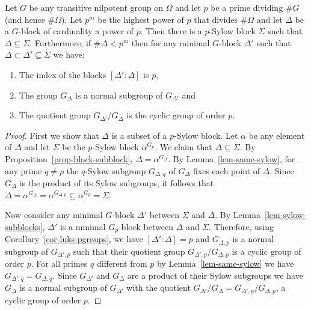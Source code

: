 \documentclass[prodmod,acmtalg]{acmsmall}
\begin{document}
\begin{theorem}\label{thm-if-g-nilpotent}
  Let $G$ be any transitive nilpotent group on $\Omega$ and let $p$ be
  a prime dividing $\# G$ (and hence $\# \Omega$). Let $p^m$ be the
  highest power of $p$ that divides $\# \Omega$ and let $\Delta$ be a
  $G$-block of cardinality a power of $p$. Then there is a $p$-Sylow
  block $\Sigma$ such that $\Delta \subseteq \Sigma$. Furthermore, if
  $\# \Delta < p^m$ then for any minimal $G$-block $\Delta'$ such that
  $\Delta \subset \Delta' \subseteq \Sigma$ we have:
  \begin{enumerate}
  \item The index of the blocks $[\Delta':\Delta]$ is $p$,
  \item The group $G_{\Delta}$ is a normal subgroup of $G_{\Delta'}$ and
  \item The quotient group $G_{\Delta'}/G_\Delta$ is the cyclic group
  of order $p$.
  \end{enumerate}
\end{theorem}
\begin{proof}
  First we show that $\Delta$ is a subset of a $p$-Sylow block.  Let
  $\alpha$ be any element of $\Delta$ and let $\Sigma$ be the
  $p$-Sylow block $\alpha^{G_p}$. We claim that $\Delta\subseteq
  \Sigma$. By Proposition~\ref{prop-block-subblock},
  $\Delta=\alpha^{G_\Delta}$. By Lemma~\ref{lem-same-sylow}, for any
  prime $q\neq p$ the $q$-Sylow subgroup $G_{\Delta,q}$ of $G_\Delta$
  fixes each point of $\Delta$. Since $G_\Delta$ is the product of its
  Sylow subgroups, it follows that
  $\Delta=\alpha^{G_\Delta}=\alpha^{G_{\Delta,p}}\subseteq
  \alpha^{G_p}=\Sigma$.

  Now consider any minimal $G$-block $\Delta'$ between $\Sigma$ and
  $\Delta$. By Lemma~\ref{lem-sylow-subblocks}, $\Delta'$ is a minimal
  $G_p$-block between $\Delta$ and $\Sigma$. Therefore, using
  Corollary~\ref{cor-luks-pgroups}, we have $[\Delta':\Delta]=p$ and
  $G_{\Delta,p}$ is a normal subgroup of $G_{\Delta',p}$ such that
  their quotient group $G_{\Delta',p}/G_{\Delta,p}$ is a cyclic group
  of order $p$. For all primes $q$ different from $p$ by
  Lemma~\ref{lem-same-sylow} we have $G_{\Delta',q} =
  G_{\Delta,q}$. Since $G_{\Delta'}$ and $G_\Delta$ are a product of
  their Sylow subgroups we have $G_\Delta$ is a normal subgroup of
  $G_{\Delta'}$ with the quotient $G_{\Delta'}/G_{\Delta} =
  G_{\Delta',p}/G_{\Delta,p}$, a cyclic group of order $p$.
\end{proof}
\end{document}
